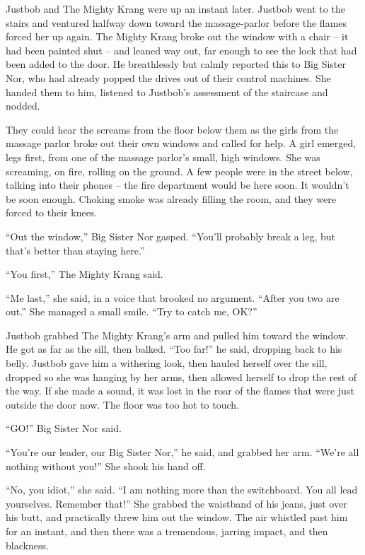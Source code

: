 Justbob and The Mighty Krang were up an instant later. Justbob went
to the stairs and ventured halfway down toward the massage-parlor
before the flames forced her up again. The Mighty Krang broke out
the window with a chair -- it had been painted shut -- and leaned
way out, far enough to see the lock that had been added to the
door. He breathlessly but calmly reported this to Big Sister Nor,
who had already popped the drives out of their control machines.
She handed them to him, listened to Justbob's assessment of the
staircase and nodded.

They could hear the screams from the floor below them as the girls
from the massage parlor broke out their own windows and called for
help. A girl emerged, legs first, from one of the massage parlor's
small, high windows. She was screaming, on fire, rolling on the
ground. A few people were in the street below, talking into their
phones -- the fire department would be here soon. It wouldn't be
soon enough. Choking smoke was already filling the room, and they
were forced to their knees.

``Out the window,'' Big Sister Nor gasped. ``You'll probably break a
leg, but that's better than staying here.''

``You first,'' The Mighty Krang said.

``Me last,'' she said, in a voice that brooked no argument. ``After
you two are out.'' She managed a small smile. ``Try to catch me,
OK?''

Justbob grabbed The Mighty Krang's arm and pulled him toward the
window. He got as far as the sill, then balked. ``Too far!'' he said,
dropping back to his belly. Justbob gave him a withering look, then
hauled herself over the sill, dropped so she was hanging by her
arms, then allowed herself to drop the rest of the way. If she made
a sound, it was lost in the roar of the flames that were just
outside the door now. The floor was too hot to touch.

``GO!'' Big Sister Nor said.

``You're our leader, our Big Sister Nor,'' he said, and grabbed her
arm. ``We're all nothing without you!'' She shook his hand off.

``No, you idiot,'' she said. ``I am nothing more than the switchboard.
You all lead yourselves. Remember that!'' She grabbed the waistband
of his jeans, just over his butt, and practically threw him out the
window. The air whistled past him for an instant, and then there
was a tremendous, jarring impact, and then blackness.

